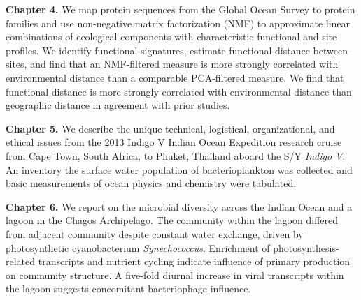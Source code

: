 

\noindent\textbf{Chapter 4.} We map protein sequences from the Global Ocean Survey to protein families and
use non-negative matrix factorization (NMF) to approximate linear combinations
of ecological components with characteristic functional and site profiles. We
identify functional signatures, estimate functional distance between sites,
and find that an NMF-filtered measure is more strongly correlated with
environmental distance than a comparable PCA-filtered measure. We find that
functional distance is more strongly correlated with environmental distance
than geographic distance in agreement with prior studies.


\noindent\textbf{Chapter 5.} We describe the unique technical, logistical, organizational, and ethical
issues from the 2013 Indigo V Indian Ocean Expedition research cruise from
Cape Town, South Africa, to Phuket, Thailand aboard the S/Y {\em Indigo V}. An
inventory the surface water population of bacterioplankton was collected and
basic measurements of ocean physics and chemistry were tabulated.


\noindent\textbf{Chapter 6.} We report on the microbial diversity across the Indian Ocean and a lagoon in
the Chagos Archipelago. The community within the lagoon differed from adjacent
community despite constant water exchange, driven by photosynthetic
cyanobacterium {\em Synechococcus}. Enrichment of photosynthesis-related
transcripts and nutrient cycling indicate influence of primary production on
community structure. A five-fold diurnal increase in viral transcripts within
the lagoon suggests concomitant bacteriophage influence.

